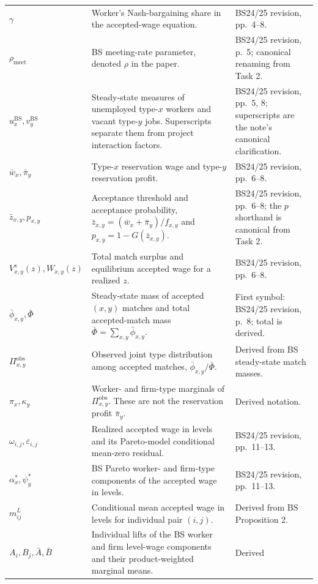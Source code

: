 \documentclass[11pt]{article}
\begin{document}
\begin{longtable}{p{}p{}p{}}
\(\gamma\) & Worker's Nash-bargaining share in the accepted-wage equation. &
BS24/25 revision, pp.\ 4--8. \\
\(\rho_{\mathrm{meet}}\) & BS meeting-rate parameter, denoted \(\rho\) in
the paper. & BS24/25 revision, p.\ 5; canonical renaming from Task 2. \\
\(u_x^{\mathrm{BS}},v_y^{\mathrm{BS}}\) & Steady-state measures of
unemployed type-\(x\) workers and vacant type-\(y\) jobs.  Superscripts
separate them from project interaction factors. & BS24/25 revision,
pp.\ 5, 8; superscripts are the note's canonical clarification. \\
\(\bar w_x,\bar\pi_y\) & Type-\(x\) reservation wage and type-\(y\)
reservation profit. & BS24/25 revision, pp.\ 6--8. \\
\(\bar z_{x,y},p_{x,y}\) & Acceptance threshold and acceptance probability,
\(\bar z_{x,y}=(\bar w_x+\bar\pi_y)/f_{x,y}\) and
\(p_{x,y}=1-G(\bar z_{x,y})\). & BS24/25 revision, pp.\ 6--8; the \(p\)
shorthand is canonical from Task 2. \\
\(V^s_{x,y}(z),W_{x,y}(z)\) & Total match surplus and equilibrium accepted
wage for a realized \(z\). & BS24/25 revision, pp.\ 6--8. \\
\(\bar\phi_{x,y},\bar\Phi\) & Steady-state mass of accepted \((x,y)\)
matches and total accepted-match mass
\(\bar\Phi=\sum_{x,y}\bar\phi_{x,y}\). & First symbol: BS24/25 revision,
p.\ 8; total is derived. \\
\(\Pi^{\mathrm{obs}}_{x,y}\) & Observed joint type distribution among
accepted matches, \(\bar\phi_{x,y}/\bar\Phi\). & Derived from BS steady-state
match masses. \\
\(\pi_x,\kappa_y\) & Worker- and firm-type marginals of
\(\Pi^{\mathrm{obs}}_{x,y}\).  These are not the reservation profit
\(\bar\pi_y\). & Derived notation. \\
\(\omega_{i,j},\varepsilon_{i,j}\) & Realized accepted wage in levels and
its Pareto-model conditional mean-zero residual. & BS24/25 revision,
pp.\ 11--13. \\
\(\alpha_x^*,\psi_y^*\) & BS Pareto worker- and firm-type components of the
accepted wage in levels. & BS24/25 revision, pp.\ 11--13. \\
\(m^{L}_{ij}\) & Conditional mean accepted wage in levels for individual
pair \((i,j)\). & Derived from BS Proposition 2. \\
\(A_i,B_j,\bar A,\bar B\) & Individual lifts of the BS worker and firm
level-wage components and their product-weighted marginal means. & Derived

\end{longtable}
\end{document}
